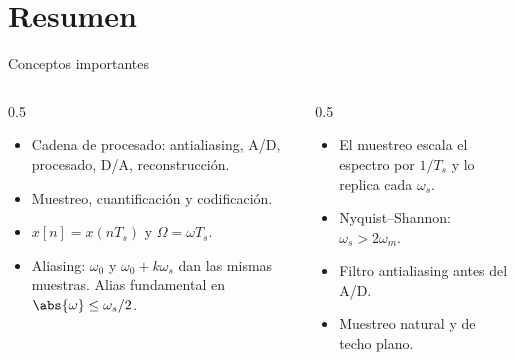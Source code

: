 \documentclass[aspectratio=169,11pt]{beamer}
\begin{document}
\section*{Resumen}
\begin{frame}{Conceptos importantes}
  \begin{columns}[T]
    \begin{column}{0.5\textwidth}
      \begin{itemize}
        \item Cadena de procesado: antialiasing, A/D, procesado, D/A, reconstrucción.
        \item Muestreo, cuantificación y codificación.
        \item $x[n]=x(nT_s)$ y $\Omega=\omega T_s$.
        \item Aliasing: $\omega_0$ y $\omega_0+k\omega_s$ dan las mismas muestras. Alias fundamental en $\abs{\omega}\le\omega_s/2$.
      \end{itemize}
    \end{column}
    \begin{column}{0.5\textwidth}
      \begin{itemize}
        \item El muestreo escala el espectro por $1/T_s$ y lo replica cada $\omega_s$.
        \item \alert{Nyquist–Shannon}: $\omega_s>2\omega_m$.
        \item Filtro antialiasing antes del A/D.
        \item Muestreo natural y de techo plano.
      \end{itemize}
    \end{column}
  \end{columns}
  \bigskip
\end{frame}
\end{document}

